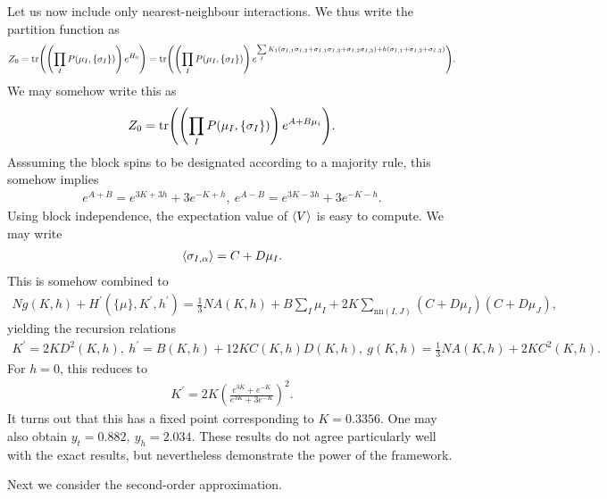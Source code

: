 Let us now include only nearest-neighbour interactions. We thus write the partition function as
\begin{align*}
	Z_{0} = \tr(\left(\prod\limits_{I}P(\mu_{I}, \{\sigma_{I}\})\right)e^{H_{0}}) = \tr(\left(\prod\limits_{I}P(\mu_{I}, \{\sigma_{I}\})\right)e^{\sum\limits_{I}K_{1}(\sigma_{I, 1}\sigma_{I, 2} + \sigma_{I, 1}\sigma_{I, 3} + \sigma_{I, 2}\sigma_{I, 3}) + h(\sigma_{I, 1} + \sigma_{I, 2} + \sigma_{I, 3})}).
\end{align*}
We may somehow write this as
\begin{align*}
	Z_{0} = \tr(\left(\prod\limits_{I}P(\mu_{I}, \{\sigma_{I}\})\right)e^{A + B\mu_{i}}).
\end{align*}
Asssuming the block spins to be designated according to a majority rule, this somehow implies
\begin{align*}
	e^{A + B} = e^{3K + 3h} + 3e^{-K + h},\ e^{A - B} = e^{3K - 3h} + 3e^{-K - h}.
\end{align*}
Using block independence, the expectation value of $\expval{V}$ is easy to compute. We may write
\begin{align*}
	\expval{\sigma_{I, \alpha}} = C + D\mu_{I}.
\end{align*}
This is somehow combined to
\begin{align*}
	Ng(K, h) + H^{\prime}(\{\mu\}, K^{\prime}, h^{\prime}) = \frac{1}{3}NA(K, h) + B\sum\limits_{I}\mu_{I} + 2K\sum\limits_{\text{nn}(I, J)}(C + D\mu_{I})(C + D\mu_{J}),
\end{align*}
yielding the recursion relations
\begin{align*}
	K^{\prime} = 2KD^{2}(K, h),\ h^{\prime} = B(K, h) + 12KC(K, h)D(K, h),\ g(K, h) = \frac{1}{3}NA(K, h) + 2KC^{2}(K, h).
\end{align*}
For $h = 0$, this reduces to
\begin{align*}
	K^{\prime} = 2K\left(\frac{e^{3K} + e^{-K}}{e^{3K} + 3e^{-K}}\right)^{2}.
\end{align*}
It turns out that this has a fixed point corresponding to $K = 0.3356$. One may also obtain $y_{t} = 0.882,\ y_{h} = 2.034$. These results do not agree particularly well with the exact results, but nevertheless demonstrate the power of the framework.

Next we consider the second-order approximation.

